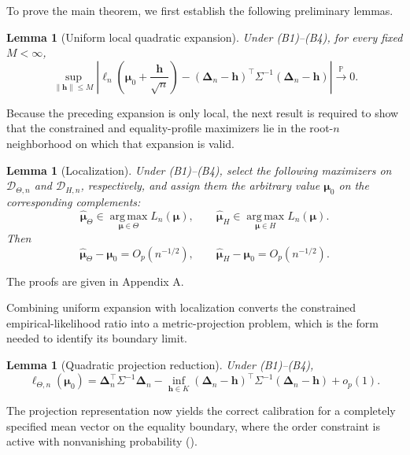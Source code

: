 \documentclass[11pt]{article}
\newtheorem{lemma}[theorem]{Lemma}
\theoremstyle{remark}
\newcommand{\Pp}{\mathbb{P}}
\newcommand{\argmax}{\operatorname*{arg\,max}}
\begin{document}
\noindent To prove the main theorem, we first establish the following preliminary lemmas.
\begin{lemma}[Uniform local quadratic expansion]\label{lem:quadratic}
Under (B1)--(B4), for every fixed $M<\infty$,
$$
  \sup_{\|\boldsymbol{h}\|\leq M}
  \left|
  \ell_n\left(\boldsymbol{\mu}_0+\frac{\boldsymbol{h}}{\sqrt n}\right)
  -
  (\boldsymbol{\Delta}_n-\boldsymbol{h})^\top\Sigma^{-1}(\boldsymbol{\Delta}_n-\boldsymbol{h})
  \right|
  \xrightarrow{\Pp}0.
$$
\end{lemma}

Because the preceding expansion is only local, the next result is required to show that the constrained and equality-profile maximizers lie in the root-$n$ neighborhood on which that expansion is valid.

\begin{lemma}[Localization]\label{lem:localization}
Under (B1)--(B4), select the following maximizers on $\mathcal D_{\Theta,n}$ and $\mathcal D_{H,n}$, respectively, and assign them the arbitrary value $\boldsymbol{\mu}_0$ on the corresponding complements:
$$
  \widehat{\boldsymbol{\mu}}_\Theta\in\argmax_{\boldsymbol{\mu}\in\Theta}L_n(\boldsymbol{\mu}),
  \qquad
  \widehat{\boldsymbol{\mu}}_H\in\argmax_{\boldsymbol{\mu}\in H}L_n(\boldsymbol{\mu}).
$$
Then
$$
  \widehat{\boldsymbol{\mu}}_\Theta-\boldsymbol{\mu}_0=O_{p}(n^{-1/2}),
  \qquad
  \widehat{\boldsymbol{\mu}}_H-\boldsymbol{\mu}_0=O_{p}(n^{-1/2}).
$$
\end{lemma}

The proofs are given in Appendix A. 

Combining uniform expansion with localization converts the constrained empirical-likelihood ratio into a metric-projection problem, which is the form needed to identify its boundary limit.

\begin{lemma}[Quadratic projection reduction]\label{lem:reduction}
Under (B1)--(B4),
\begin{equation}\label{eq:projection-reduction}
  \ell_{\Theta,n}(\boldsymbol{\mu}_0)
  =
  \boldsymbol{\Delta}_n^\top\Sigma^{-1}\boldsymbol{\Delta}_n
  -
  \inf_{\boldsymbol{h}\in K}
  (\boldsymbol{\Delta}_n-\boldsymbol{h})^\top\Sigma^{-1}(\boldsymbol{\Delta}_n-\boldsymbol{h})
  +o_{p}(1).
\end{equation}
\end{lemma}

The projection representation now yields the correct calibration for a completely specified mean vector on the equality boundary, where the order constraint is active with nonvanishing probability (\citet{el1996empirical}). 
\end{document}
